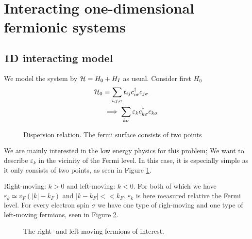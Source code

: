 \section{Interacting one-dimensional fermionic systems}

\subsection[Model]{1D interacting model}

We model the system by $\mathcal{H} = H_0 + H_I$ as usual. Consider first $H_0$
\begin{align*}
	\mathcal{H}_0 &= \sum_{i,j,\sigma}t_{ij}c^{\dagger}_{i\sigma}c_{j\sigma} \\
	&\implies \sum_{k \sigma}\varepsilon_kc^{\dagger}_{k\sigma}c_{k\sigma}
\end{align*}

\begin{figure}
	\centering
	
	\caption{Dispersion relation. The fermi surface consists of two points}
	\label{fig:disp_rel}
\end{figure}

We are mainly interested in the low energy physics for this problem; We want to describe $\varepsilon_k$ in the vicinity of the Fermi level. In this case, it is especially simple as it only consists of two points, as seen in Figure \ref{fig:disp_rel}.

Right-moving: $k>0$ and left-moving: $k<0$. For both of which we have  $\varepsilon_k\simeq v_F(|k| - k_F)$ and $|k-k_F|<<k_F$. $\varepsilon_k$ is here measured relative the Fermi level.
For every electron spin $\sigma$ we have one type of righ-moving and one type of left-moving fermions, seen in Figure \ref{fig:lr_fermions}.

\begin{figure}
	\centering
	
	\caption{The right- and left-moving fermions of interest.}
	\label{fig:lr_fermions}
\end{figure}

